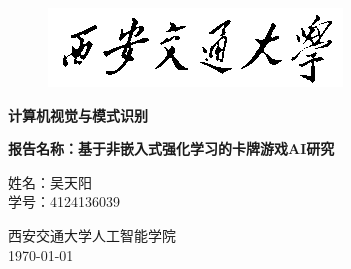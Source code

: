 \documentclass[openany,twoside,nofonts,AutoFakeBold,UTF8]{ctexbook}
\begin{document}





\begin{titlepage}
\begin{figure}[htbp]
  \centering
  \includegraphics[width=0.8\linewidth]{../../../校徽/XJTU_logo.png}
\end{figure}
\centering\bfseries{} 计算机视觉与模式识别\\[2ex]
{
{\vspace{5ex}
\begin{center}
\bf
\noindent 报告名称：基于非嵌入式强化学习的卡牌游戏AI研究
\end{center}
}
\vspace{2ex}

\begin{center}
  姓名：吴天阳\\
  学号：4124136039\\
\end{center}
}
\vfill
\begin{center}
西安交通大学\quad 人工智能学院\\[2ex]
\today %
\end{center}
\end{titlepage}


\frontmatter

% 
% 
% 
\end{document}
